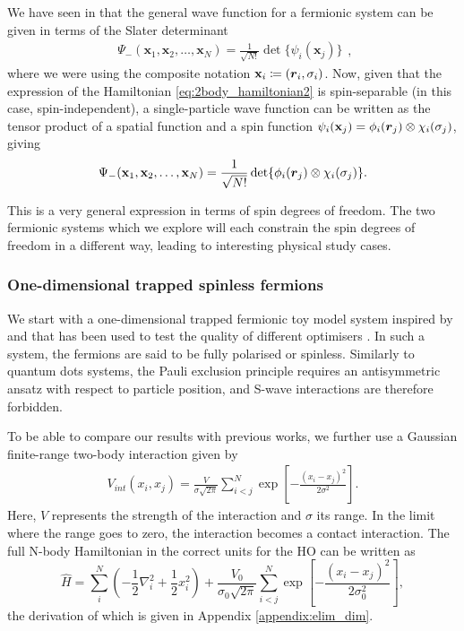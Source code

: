 We have seen in  that the general wave function for a fermionic system can be given in terms of the Slater determinant 
\begin{equation*}
    \begin{split}
\Psi_-(\mathbf{x}_1, \mathbf{x}_2, \ldots, \mathbf{x}_N) 
= \frac{1}{\sqrt{N!}}  \det\{\psi_i(\mathbf{x}_j)\}
\end{split},
\end{equation*}
where we were using the composite notation $\mathbf{x}_i \coloneqq  (\boldsymbol{r}_i, \sigma_i)$. Now, given that the expression of the Hamiltonian \eqref{eq:2body_hamiltonian2} is spin-separable (in this case, spin-independent), a single-particle wave function can be written as the tensor product of a spatial function and a spin function $\psi_i(\mathbf{x}_j) =  \phi_i(\boldsymbol{r}_j)\otimes\chi_i(\sigma_j)$, giving
\begin{equation}
\Psi_-(\mathbf{x}_1, \mathbf{x}_2, \ldots, \mathbf{x}_N) 
= \frac{1}{\sqrt{N!}}  \det\{\phi_i(\boldsymbol{r}_j)\otimes\chi_i(\sigma_j)\}.
\label{eq:general_slater}
\end{equation}

This is a very general expression in terms of spin degrees of freedom. The two fermionic systems which we explore will each constrain the spin degrees of freedom in a different way, leading to interesting physical study cases.

\subsubsection{One-dimensional trapped spinless fermions}
We start with a one-dimensional trapped fermionic toy model system inspired by \cite{drissifermion} and that has been used to test the quality of different optimisers \cite{drissi2024second}. In such a system, the fermions are said to be fully polarised or spinless. Similarly to quantum dots systems, the Pauli exclusion principle requires an antisymmetric ansatz with respect to particle position, and S-wave interactions are therefore forbidden.

To be able to compare our results with previous works, we further use a Gaussian finite-range two-body interaction given by 
\begin{align*}
    V_{int}(x_i,x_j) =  \frac{V}{\sigma\sqrt{2\pi}}\sum_{i<j}^{N} \exp\left[-\frac{(x_i-x_j)^2}{2\sigma^2}\right].
\end{align*}
Here, $V$ represents the strength of the interaction and $\sigma$ its range. In the limit where the range goes to zero, the interaction becomes a contact interaction. The full N-body Hamiltonian in the correct units for the HO can be written as
\begin{equation}
     \hat{H} = \sum_i^N \left(-\frac{1}{2}{\nabla }_{i}^2 + \frac{1}{2}x_i^2\right)  +
	 \frac{V_0}{\sigma_0\sqrt{2\pi}}\sum_{i<j}^{N} \exp\left[-\frac{(x_i-x_j)^2}{2\sigma_0^2}\right],
\label{eq:spinless1d}
\end{equation}
the derivation of which is given in Appendix \ref{appendix:elim_dim}.

